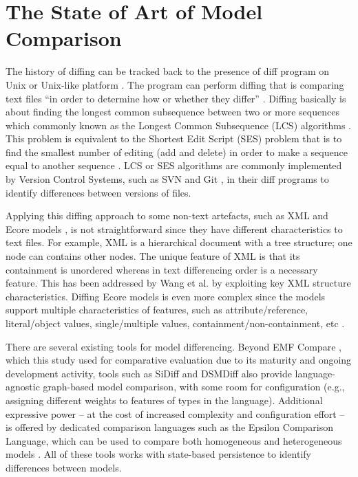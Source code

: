 \section{The State of Art of Model Comparison}
\label{sec:the_state_of_art_of_model_comparison}
The history of diffing can be tracked back to the presence of \textsf{diff} program on Unix or Unix-like platform \cite{hunt1976algorithm}. The program can perform diffing that is comparing text files ``in order to determine how or whether they differ'' \cite{diff}. Diffing basically is about finding the longest common subsequence between two or more sequences which commonly known as the Longest Common Subsequence (LCS) algorithms \cite{bergroth2000lcs}. This problem is equivalent to the Shortest Edit Script (SES) problem that is to find the smallest number of editing (add and delete) in order to make a sequence equal to another sequence \cite{DBLP:journals/algorithmica/Meyers86}. LCS or SES algorithms are commonly implemented by Version Control Systems, such as SVN \cite{svn-diff} and Git \cite{git-diff}, in their \textsf{diff} programs to identify differences between versions of files.   

Applying this diffing approach to some non-text artefacts, such as XML \cite{w3c-xml} and Ecore models \cite{steinberg2008emf}, is not straightforward since they have different characteristics to text files. For example, XML is a hierarchical document with a tree structure; one node can contains other nodes. The unique feature of XML is that its containment is  unordered whereas in text differencing order is a necessary feature. This has been addressed by Wang et al. \cite{wang2003xdiff} by exploiting key XML  structure characteristics. Diffing Ecore models is even more complex since the models support multiple characteristics of features, such as attribute/reference, literal/object values, single/multiple values, containment/non-containment, etc \cite{steinberg2008emf}. 

There are several existing tools for model differencing. Beyond EMF Compare \cite{emfcompare2018developer}, which this study used for comparative evaluation due to its maturity and ongoing development activity, tools such as SiDiff \cite{Treude2007SiDiff} and DSMDiff \cite{lin2009dsmdiff} also provide language-agnostic graph-based model comparison, with some room for configuration (e.g., assigning different weights to features of types in the language). Additional expressive power -- at the cost of increased complexity and configuration effort -- is offered by dedicated comparison languages such as the Epsilon Comparison Language, which can be used to compare both homogeneous and heterogeneous models \cite{kolovos2009ecl}. All of these tools works with state-based persistence to identify differences between models.

